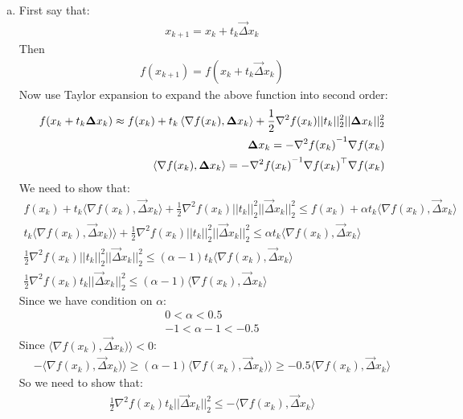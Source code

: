 \documentclass[12pt,twoside]{article}
\begin{document}
\begin{enumerate}[a)]
\item 
First say that:
\begin{align}
x_{k+1} = x_k + t_k \vec{\Delta}x_k
\end{align}
Then 
\begin{align}
f(x_{k+1}) = f(x_k + t_k \vec{\Delta}x_k)
\end{align}
Now use Taylor expansion to expand the above function into second order:
\begin{align}
f(x_k + t_k {\boldsymbol{{\Delta}}}x_k) \approx f(x_k) + t_k\left\langle\nabla f(x_k), {\boldsymbol{{\Delta}}}x_k\right\rangle + \frac{1}{2}\nabla^2 f(x_k)||t_k||_2^2||{\boldsymbol{{\Delta}}}x_k||_2^2\\
{\boldsymbol{{\Delta}}}x_k = - {\nabla^2 f(x_k)}^{-1}  \nabla f(x_k)\\
\left\langle\nabla f(x_k), {\boldsymbol{{\Delta}}}x_k\right\rangle = -{\nabla^2 f(x_k)}^{-1} {\nabla f(x_k)}^\top \nabla f(x_k)
\end{align}
We need to show that:
\begin{align}
f(x_k) + t_k\langle \nabla f(x_k), \vec{\Delta}x_k\rangle + \frac{1}{2}\nabla^2 f(x_k)||t_k||_2^2||\vec{\Delta}x_k||_2^2 \leq f(x_k) + \alpha t_k \langle\nabla f(x_k), \vec{\Delta}x_k\rangle\\
t_k\langle\nabla f(x_k), \vec{\Delta}x_k)\rangle + \frac{1}{2}\nabla^2 f(x_k)||t_k||_2^2||\vec{\Delta}x_k||_2^2 \leq   \alpha t_k \langle\nabla f(x_k), \vec{\Delta}x_k\rangle\\
\frac{1}{2}\nabla^2 f(x_k)||t_k||_2^2||\vec{\Delta}x_k||_2^2 \leq   (\alpha - 1) t_k \langle\nabla f(x_k), \vec{\Delta}x_k\rangle\\
\frac{1}{2}\nabla^2 f(x_k)t_k||\vec{\Delta}x_k||_2^2 \leq   (\alpha - 1)\langle\nabla f(x_k), \vec{\Delta}x_k\rangle
\end{align}
Since we have condition on $\alpha$:
\begin{align}
0 < \alpha < 0.5\\
-1 < \alpha - 1 < -0.5
\end{align}
Since $\langle\nabla f(x_k), \vec{\Delta}x_k)\rangle < 0$:
\begin{align}
-\langle\nabla f(x_k), \vec{\Delta}x_k)\rangle \geq (\alpha - 1)\langle\nabla f(x_k), \vec{\Delta}x_k)\rangle \geq -0.5\langle\nabla f(x_k), \vec{\Delta}x_k\rangle
\end{align}
So we need to show that:
\begin{align}
\frac{1}{2}\nabla^2 f(x_k)t_k||\vec{\Delta}x_k||_2^2 \leq -\langle\nabla f(x_k), \vec{\Delta}x_k\rangle\\

\end{align}
\end{enumerate}
\end{document}

